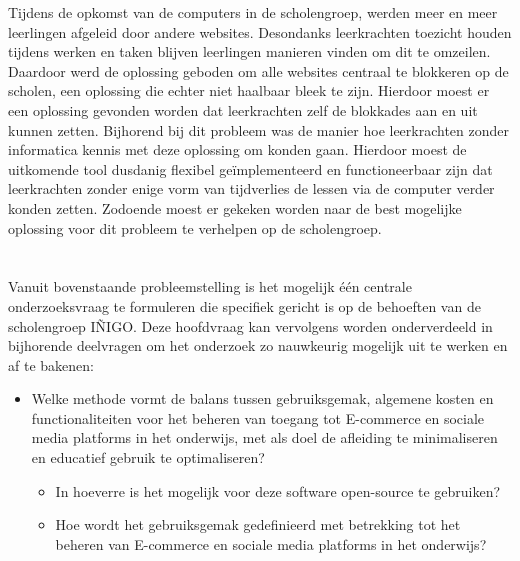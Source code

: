 Tijdens de opkomst van de computers in de scholengroep, werden meer en meer leerlingen afgeleid door andere websites. Desondanks leerkrachten toezicht houden tijdens werken en taken blijven leerlingen manieren vinden om dit te omzeilen. Daardoor werd de oplossing geboden om alle websites centraal te blokkeren op de scholen, een oplossing die echter niet haalbaar bleek te zijn. Hierdoor moest er een oplossing gevonden worden dat leerkrachten zelf de blokkades aan en uit kunnen zetten. Bijhorend bij dit probleem was de manier hoe leerkrachten zonder informatica kennis met deze oplossing om konden gaan. Hierdoor moest de uitkomende tool dusdanig flexibel geïmplementeerd en functioneerbaar zijn dat leerkrachten zonder enige vorm van tijdverlies de lessen via de computer verder konden zetten. Zodoende moest er gekeken worden naar de best mogelijke oplossing voor dit probleem te verhelpen op de scholengroep. \newline

\section{}%
\label{sec:onderzoeksvraag}
Vanuit bovenstaande probleemstelling is het mogelijk één centrale onderzoeksvraag te formuleren die specifiek gericht is op de behoeften van de scholengroep IÑIGO. Deze hoofdvraag kan vervolgens worden onderverdeeld in bijhorende deelvragen om het onderzoek zo nauwkeurig mogelijk uit te werken en af te bakenen:
\begin{itemize}
    \item Welke methode vormt de balans tussen gebruiksgemak, algemene kosten en functionaliteiten voor het beheren van toegang tot E-commerce en sociale media platforms in het onderwijs, met als doel de afleiding te minimaliseren en educatief gebruik te optimaliseren? 
    \begin{itemize}
        \item In hoeverre is het mogelijk voor deze software open-source te gebruiken?
        \item Hoe wordt het gebruiksgemak gedefinieerd met betrekking tot het beheren van E-commerce en sociale media platforms in het onderwijs?    
    \end{itemize}
\end{itemize}

\section{}%
\label{sec:onderzoeksdoelstelling}

